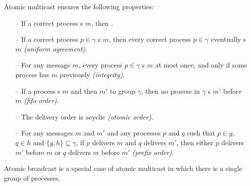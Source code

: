 Atomic multicast ensures the following properties:

\begin{itemize}

    \item[--] If a correct process \amcast{}s $m$, then .

      \item[--] If a correct process $p \in \gamma$ \amdel{}s $m$, then every correct
      process $p \in \gamma$ eventually \amdel{}s $m$ \emph{(uniform agreement)}.

    \item[--] For any message $m$, every process $p \in \gamma$ \amdel{}s $m$ at most once, and
      only if some process has \amcast{} $m$ previously \emph{(integrity)}.

    \item[--] If a process \amcast{}s $m$ and then $m'$ to group $\gamma$, then
    no process in $\gamma$ \amdel{}s $m'$ before $m$ \emph{(fifo order)}.

    \item[--] The delivery order is acyclic \emph{(atomic order)}.

    \item[--] For any messages $m$ and $m'$ and any processes $p$ and $q$ such
      that $p \in g$, $q \in h$ and $\{ g, h \} \subseteq \gamma$, if $p$
      delivers $m$ and $q$ delivers $m'$, then either $p$ delivers $m'$ before
      $m$ or $q$ delivers $m$ before $m'$ \emph{(prefix order)}.

\end{itemize}

Atomic broadcast is a special case of atomic multicast in which there
is a single group of processes.


